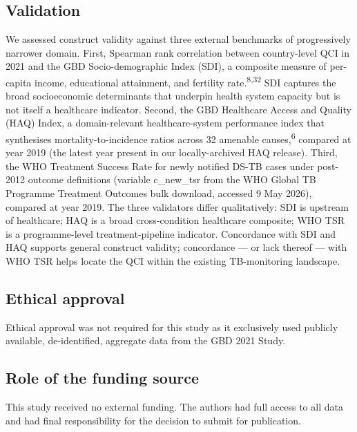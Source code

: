 \documentclass[12pt]{article}
\begin{document}
\subsection{Validation}

We assessed construct validity against three external benchmarks of progressively narrower domain. First, Spearman rank correlation between country-level QCI in 2021 and the GBD Socio-demographic Index (SDI), a composite measure of per-capita income, educational attainment, and fertility rate.\textsuperscript{8,32} SDI captures the broad socioeconomic determinants that underpin health system capacity but is not itself a healthcare indicator. Second, the GBD Healthcare Access and Quality (HAQ) Index, a domain-relevant healthcare-system performance index that synthesises mortality-to-incidence ratios across 32 amenable causes,\textsuperscript{6} compared at year 2019 (the latest year present in our locally-archived HAQ release). Third, the WHO Treatment Success Rate for newly notified DS-TB cases under post-2012 outcome definitions (variable c\_new\_tsr from the WHO Global TB Programme Treatment Outcomes bulk download, accessed 9 May 2026), compared at year 2019. The three validators differ qualitatively: SDI is upstream of healthcare; HAQ is a broad cross-condition healthcare composite; WHO TSR is a programme-level treatment-pipeline indicator. Concordance with SDI and HAQ supports general construct validity; concordance --- or lack thereof --- with WHO TSR helps locate the QCI within the existing TB-monitoring landscape.

\subsection{Ethical approval}

Ethical approval was not required for this study as it exclusively used publicly available, de-identified, aggregate data from the GBD 2021 Study.

\subsection{Role of the funding source}

This study received no external funding. The authors had full access to all data and had final responsibility for the decision to submit for publication.

\end{document}
